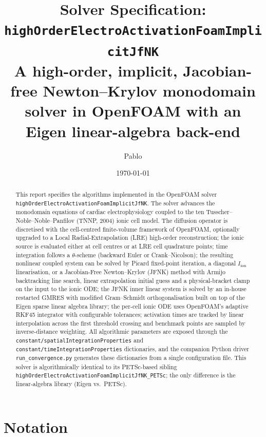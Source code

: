 \documentclass[11pt,a4paper]{article}
\title{Solver Specification:\\
       \texorpdfstring{\texttt{highOrderElectroActivationFoamImplicitJfNK}}{highOrderElectroActivationFoamImplicitJfNK}\\
       \large A high-order, implicit, Jacobian-free Newton--Krylov
       monodomain solver in OpenFOAM with an Eigen linear-algebra back-end}
\author{Pablo}
\date{\today}
\newcommand{\Iion}{I_{\text{ion}}}
\newcommand{\code}[1]{\texttt{\small #1}}
\begin{document}
\maketitle

\begin{abstract}
This report specifies the algorithms implemented in the OpenFOAM solver
\code{highOrderElectroActivationFoamImplicitJfNK}. The solver
advances the monodomain equations of cardiac electrophysiology coupled
to the ten Tusscher--Noble--Noble--Panfilov (TNNP, 2004) ionic cell
model. The diffusion operator is discretised with the cell-centred
finite-volume framework of OpenFOAM, optionally upgraded to a Local
Radial-Extrapolation (LRE) high-order reconstruction; the ionic source
is evaluated either at cell centres or at LRE cell quadrature points;
time integration follows a $\theta$-scheme (backward Euler or
Crank--Nicolson); the resulting nonlinear coupled system can be solved
by Picard fixed-point iteration, a diagonal $\Iion$ linearisation, or a
Jacobian-Free Newton--Krylov (JFNK) method with Armijo backtracking line
search, linear extrapolation initial guess and a physical-bracket clamp
on the input to the ionic ODE; the JFNK inner linear system is solved by
an in-house restarted GMRES with modified Gram--Schmidt orthogonalisation
built on top of the Eigen sparse linear algebra library; the per-cell
ionic ODE uses OpenFOAM's adaptive RKF45
integrator with configurable tolerances; activation times are tracked
by linear interpolation across the first threshold crossing and
benchmark points are sampled by inverse-distance weighting. All
algorithmic parameters are exposed through the
\code{constant/spatialIntegrationProperties} and
\code{constant/timeIntegrationProperties} dictionaries, and the
companion Python driver \code{run\_convergence.py} generates these
dictionaries from a single configuration file. This solver is
algorithmically identical to its PETSc-based sibling
\code{highOrderElectroActivationFoamImplicitJfNK\_PETSc}; the only
difference is the linear-algebra library (Eigen vs.\ PETSc).
\end{abstract}

\tableofcontents
\bigskip

\section{Notation}
\end{document}
